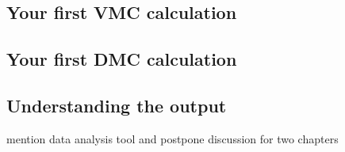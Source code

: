 \subsection{Your first VMC calculation}
\subsection{Your first DMC calculation}
\subsection{Understanding the output}
mention data analysis tool and postpone discussion for two chapters
